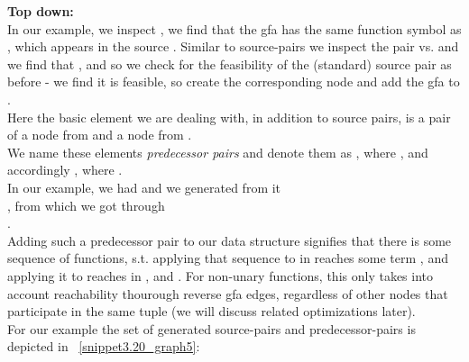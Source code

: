 \noindent
\textbf{Top down:}\\
In our example, we inspect , we find that the gfa  has the same function symbol as ,
which appears in the source . Similar to source-pairs we inspect the pair  vs.  and
we find that , and so we check for the feasibility of the (standard) source pair 
 as before - we find it is feasible, so create the corresponding  node  and add the gfa  to .\\
Here the basic element we are dealing with, in addition to source pairs, is a pair of a node from  and a node from .\\
We name these elements \emph{predecessor pairs} and denote them as , where ,
and accordingly , where .\\
In our example, we had  and we generated from it \\
, 
from which we got  through \\
.\\
Adding such a predecessor pair  to our data structure signifies that there is some sequence of functions,
s.t. applying that sequence to  in  reaches some term , and applying it to  reaches  in ,
and . For non-unary functions, this only takes into account reachability thourough reverse gfa edges, 
regardless of other nodes that participate in the same tuple (we will discuss related optimizations later).\\
For our example the set of generated source-pairs and predecessor-pairs is depicted in ~\ref{snippet3.20_graph5}:

